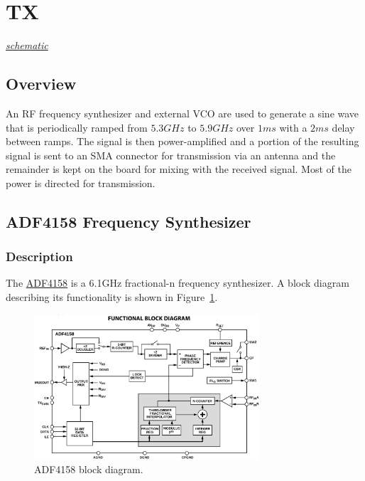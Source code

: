 \section{TX}
\label{sec:tx}
\textit{\hyperlink{schematic.5}{schematic}}

\subsection{Overview}
\label{sec:tx-overview}

An RF frequency synthesizer and external VCO are used to generate a sine wave that is periodically
ramped from $5.3 \si{GHz}$ to $5.9 \si{GHz}$ over $1 \si{ms}$ with a $2 \si{ms}$ delay between
ramps. The signal is then power-amplified and a portion of the resulting signal is sent to an SMA
connector for transmission via an antenna and the remainder is kept on the board for mixing with the
received signal. Most of the power is directed for transmission.

\subsection{ADF4158 Frequency Synthesizer}
\label{sec:adf4158-freq-synth}

\subsubsection{Description}
\label{sec:adf4158-description}

The \href{http://www.analog.com/media/en/technical-documentation/data-sheets/ADF4158.pdf}{ADF4158}
is a 6.1GHz fractional-n frequency synthesizer. A block diagram describing its functionality is shown in
Figure~\ref{fig:adf4158-block-diagram}.

\begin{figure}[h]
        \centering
        \includegraphics[width=0.75\textwidth]{data/adf4158-block-diagram.png}
        \caption{ADF4158 block diagram.}
        \label{fig:adf4158-block-diagram}
\end{figure}

